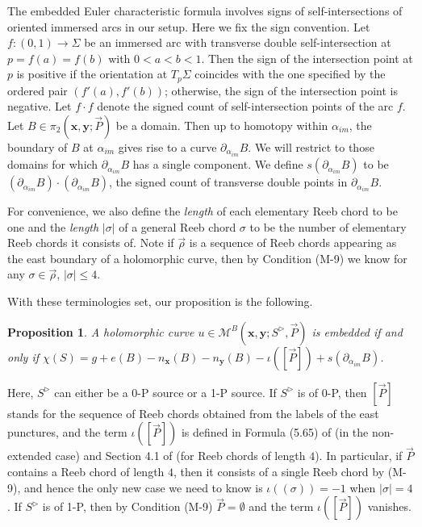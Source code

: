 \documentclass{amsart}
\newtheorem{prop}[thm]{Proposition}
\theoremstyle{definition}
\theoremstyle{remark}
\numberwithin{equation}{section}
\numberwithin{equation}{section} \makeatletter
\begin{document}
The embedded Euler characteristic formula involves signs of self-intersections of oriented immersed arcs in our setup. Here we fix the sign convention. Let $f:(0,1)\rightarrow \Sigma$ be an immersed arc with transverse double self-intersection at $p=f(a)=f(b)$ with $0<a<b<1$. Then the sign of the intersection point at $p$ is positive if the orientation at $T_p\Sigma$ coincides with the one specified by the ordered pair $(f'(a),f'(b))$; otherwise, the sign of the intersection point is negative. Let $f\cdot f$ denote the signed count of self-intersection points of the arc $f$. Let $B\in\pi_2(\bm{x},\bm{y};\overrightarrow{P})$ be a domain. Then up to homotopy within $\alpha_{im}$, the boundary of $B$ at $\alpha_{im}$ gives rise to a curve $\partial_{\alpha_{im}}B$. We will restrict to those domains for which $\partial_{\alpha_{im}} B$ has a single component. We define $s(\partial_{\alpha_{im}}B)$ to be $(\partial_{\alpha_{im}} B) \cdot (\partial_{\alpha_{im}} B)$, the signed count of transverse double points in $\partial_{\alpha_{im}}B$.  

For convenience, we also define the \emph{length} of each elementary Reeb chord to be one and the \emph{length} $|\sigma|$ of a general Reeb chord $\sigma$ to be the number of elementary Reeb chords it consists of. Note if $\overrightarrow{\rho}$ is a sequence of Reeb chords appearing as the east boundary of a holomorphic curve, then by Condition (M-9) we know for any $\sigma \in \overrightarrow{\rho}$, $|\sigma|\leq 4$.

With these terminologies set, our proposition is the following. 

\begin{prop}\label{Proposition, embedded Euler characteristic}
A holomorphic curve $u\in \mathcal{M}^B(\bm{x},\bm{y};S^\triangleright,\overrightarrow{P})$ is embedded if and only if $\chi(S)=g+e(B)-n_{\bm{x}}(B)-n_{\bm{y}}(B)-\iota([\overrightarrow{P}])+s(\partial_{\alpha_{im}}B)$.
\end{prop}

Here, $S^\triangleright$ can either be a 0-P source or a 1-P source. If $S^\triangleright$ is of 0-P, then $[\overrightarrow{P}]$ stands for the sequence of Reeb chords obtained from the labels of the east punctures, and the term $\iota([\overrightarrow{P}])$ is defined in Formula (5.65) of \cite{LOT18} (in the non-extended case) and Section 4.1 of \cite{Lipshitz2021} (for Reeb chords of length $4$). In particular, if $\overrightarrow{P}$ contains a Reeb chord of length $4$, then it consists of a single Reeb chord by (M-9), and hence the only new case we need to know is $\iota((\sigma))=-1$ when $|\sigma|=4$. If $S^\triangleright$ is of 1-P, then by Condition (M-9) $\overrightarrow{P}=\emptyset$ and the term $\iota([\overrightarrow{P}])$ vanishes.
\end{document}
